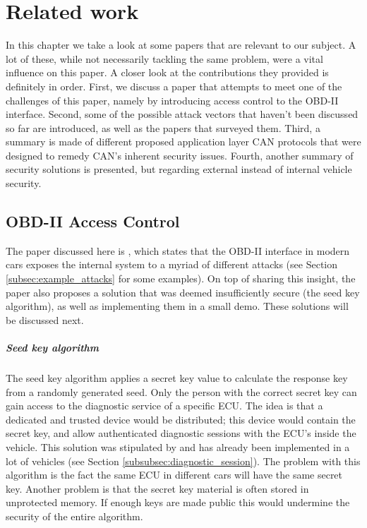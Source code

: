 \chapter{Related work}
\label{chap:related_work}

In this chapter we take a look at some papers that are relevant to our subject. A lot of these, while not necessarily tackling the same problem, were a vital influence on this paper. A closer look at the contributions they provided is definitely in order. First, we discuss a paper that attempts to meet one of the challenges of this paper, namely by introducing access control to the OBD-II interface. Second, some of the possible attack vectors that haven't been discussed so far are introduced, as well as the papers that surveyed them. Third, a summary is made of different proposed application layer CAN protocols that were designed to remedy CAN's inherent security issues. Fourth, another summary of security solutions is presented, but regarding external instead of internal vehicle security. 

\section{OBD-II Access Control}
\label{sec:obd_access_control}

The paper discussed here is \cite{Yadav16}, which states that the OBD-II interface in modern cars exposes the internal system to a myriad of different attacks (see Section \ref{subsec:example_attacks} for some examples). On top of sharing this insight, the paper also proposes a solution that was deemed insufficiently secure (the seed key algorithm), as well as implementing them in a small demo. These solutions will be discussed next.


\paragraph{Seed key algorithm} The seed key algorithm applies a secret key value to calculate the response key from a randomly generated seed. Only the person with the correct secret key can gain access to the diagnostic service of a specific ECU. The idea is that a dedicated and trusted device would be distributed; this device would contain the secret key, and allow authenticated diagnostic sessions with the ECU's inside the vehicle. This solution was stipulated by \cite{Bayer} and has already been implemented in a lot of vehicles (see Section \ref{subsubsec:diagnostic_session}). The problem with this algorithm is the fact the same ECU in different cars will have the same secret key. Another problem is that the secret key material is often stored in unprotected memory. If enough keys are made public this would undermine the security of the entire algorithm.  

